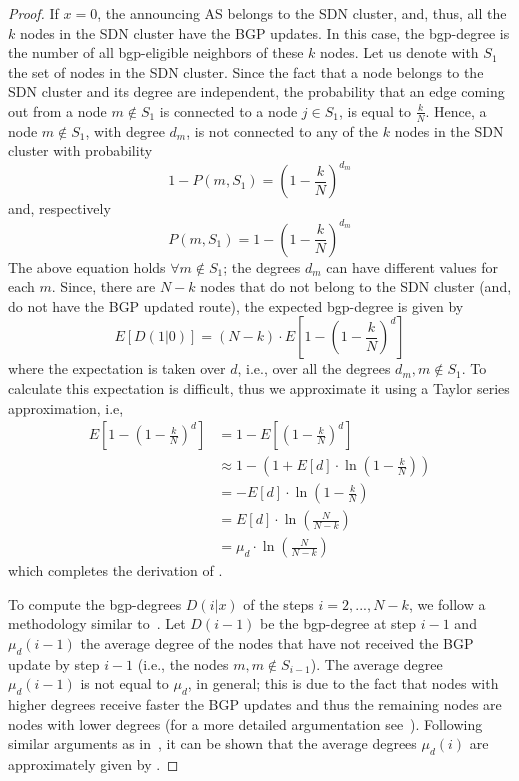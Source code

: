 \begin{proof}
If $x=0$, the announcing AS belongs to the SDN cluster, and, thus, all the $k$ nodes in the SDN cluster have the BGP updates. In this case, the bgp-degree is the number of all bgp-eligible neighbors of these $k$ nodes. Let us denote with $S_{1}$ the set of nodes in the SDN cluster. Since the fact that a node belongs to the SDN cluster and its degree are independent, the probability that an edge coming out from a node $m\notin S_{1}$ is connected to a node $j\in S_{1}$, is equal to $\frac{k}{N}$. Hence, a node $m\notin S_{1}$, with degree $d_{m}$, is not connected to any of the $k$ nodes in the SDN cluster with probability
\begin{equation}
1-P(m,S_{1}) = \left(1-\frac{k}{N}\right)^{d_{m}}
\end{equation}
and, respectively
\begin{equation}
P(m,S_{1}) = 1-\left(1-\frac{k}{N}\right)^{d_{m}}
\end{equation}
The above equation holds $\forall m\notin S_{1}$; the degrees $d_{m}$ can have different values for each $m$. Since, there are $N-k$ nodes that do not belong to the SDN cluster (and, do not have the BGP updated route), the expected bgp-degree is given by
\begin{equation}
E[D(1|0)] = (N-k)\cdot E\left[1-\left(1-\frac{k}{N}\right)^{d}\right]
\end{equation}
where the expectation is taken over $d$, i.e., over all the degrees $d_{m}, m\notin S_{1}$. To calculate this expectation is difficult, thus we approximate it using a Taylor series approximation, i.e, 
\begin{align}
E\left[1-\left(1-\frac{k}{N}\right)^{d}\right] &= 1-E\left[\left(1-\frac{k}{N}\right)^{d}\right]  \nonumber\\
		&\approx 1-\left(1+E[d]\cdot \ln\left(1-\frac{k}{N}\right)\right) \nonumber\\
		&= - E[d]\cdot \ln\left(1-\frac{k}{N}\right)\nonumber\\
		&= E[d]\cdot \ln\left(\frac{N}{N-k}\right) \nonumber \\
		&= \mu_{d}\cdot \ln\left(\frac{N}{N-k}\right)
\end{align}
which completes the derivation of .

To compute the bgp-degrees $D(i|x)$ of the steps $i=2,...,N-k$, we follow a methodology similar to~\cite{pavlos-conf-model}. Let $D(i-1)$ be the bgp-degree at step $i-1$ and $\mu_{d}(i-1)$ the average degree of the nodes that have not received the BGP update by step $i-1$  (i.e., the nodes $m, m\notin S_{i-1}$). The average degree $\mu_{d}(i-1)$ is not equal to $\mu_{d}$, in general; this is due to the fact that nodes with higher degrees receive faster the BGP updates and thus the remaining nodes are nodes with lower degrees (for a more detailed argumentation see~\cite{pavlos-conf-model}). Following similar arguments as in~\cite{pavlos-conf-model}, it can be shown that the average degrees $\mu_{d}(i)$ are approximately given by .


\end{proof}
